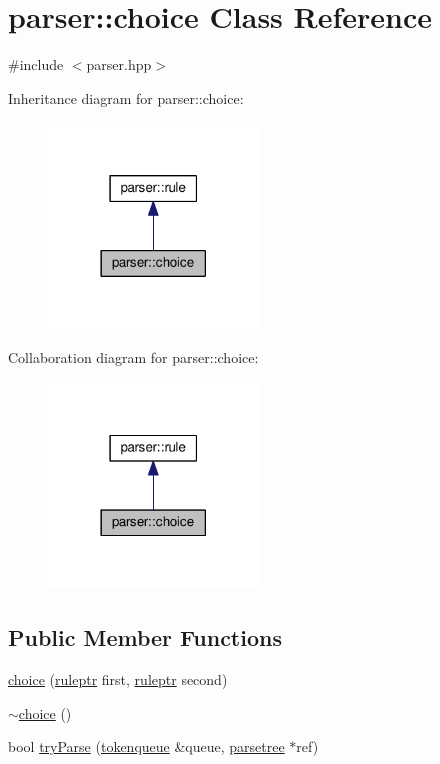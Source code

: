 \hypertarget{classparser_1_1choice}{}\section{parser\+:\+:choice Class Reference}
\label{classparser_1_1choice}


{\ttfamily \#include $<$parser.\+hpp$>$}



Inheritance diagram for parser\+:\+:choice\+:
\nopagebreak
\begin{figure}[H]
\begin{center}
\leavevmode
\includegraphics[width=158pt]{classparser_1_1choice__inherit__graph}
\end{center}
\end{figure}


Collaboration diagram for parser\+:\+:choice\+:
\nopagebreak
\begin{figure}[H]
\begin{center}
\leavevmode
\includegraphics[width=158pt]{classparser_1_1choice__coll__graph}
\end{center}
\end{figure}
\subsection*{Public Member Functions}
\begin{DoxyCompactItemize}
\item 
\hyperlink{classparser_1_1choice_ae9e624b9260ed9006741d6870ea334e4}{choice} (\hyperlink{namespaceparser_a85b2df48287fddaca144a5f6c01b4761}{ruleptr} first, \hyperlink{namespaceparser_a85b2df48287fddaca144a5f6c01b4761}{ruleptr} second)
\item 
\hyperlink{classparser_1_1choice_ad6fe3cd8e19171e387c8ff34e1291f83}{$\sim$choice} ()
\item 
bool \hyperlink{classparser_1_1choice_a76d73bd6b3adb0c8a062b46a4d49cd11}{try\+Parse} (\hyperlink{classparser_1_1tokenqueue}{tokenqueue} \&queue, \hyperlink{structparser_1_1parsetree}{parsetree} $\ast$ref)
\end{DoxyCompactItemize}
